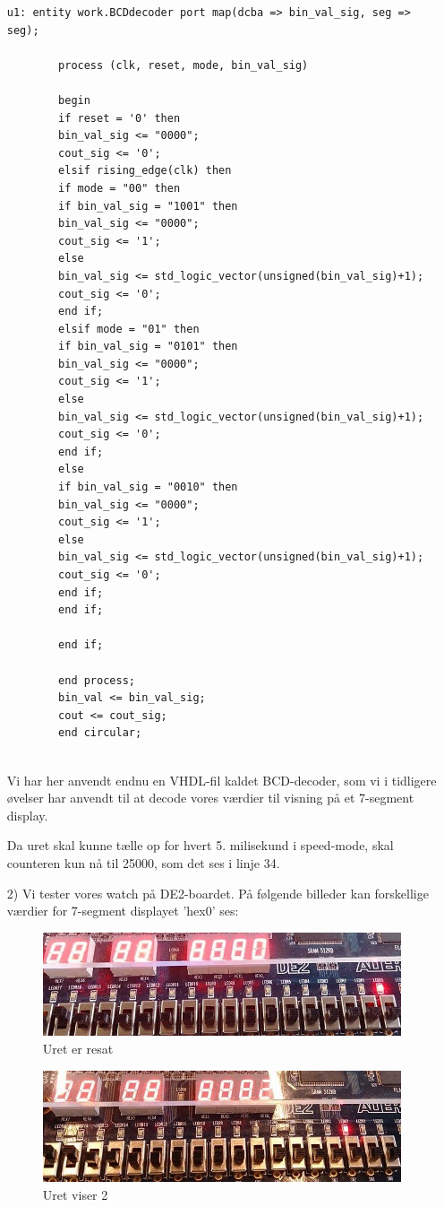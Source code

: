 \begin{enumerate}
\begin{lstlisting}[caption={VHDL code for binary circular counter},label={lst:Counter}]
		u1: entity work.BCDdecoder port map(dcba => bin_val_sig, seg => seg);
		
		process (clk, reset, mode, bin_val_sig)
		
		begin
		if reset = '0' then
		bin_val_sig <= "0000";
		cout_sig <= '0';
		elsif rising_edge(clk) then
		if mode = "00" then
		if bin_val_sig = "1001" then 
		bin_val_sig <= "0000";
		cout_sig <= '1';
		else
		bin_val_sig <= std_logic_vector(unsigned(bin_val_sig)+1);
		cout_sig <= '0';
		end if;
		elsif mode = "01" then
		if bin_val_sig = "0101" then 
		bin_val_sig <= "0000";
		cout_sig <= '1';
		else
		bin_val_sig <= std_logic_vector(unsigned(bin_val_sig)+1);
		cout_sig <= '0';
		end if;
		else 
		if bin_val_sig = "0010" then 
		bin_val_sig <= "0000";
		cout_sig <= '1';
		else
		bin_val_sig <= std_logic_vector(unsigned(bin_val_sig)+1);
		cout_sig <= '0';
		end if;
		end if;
		
		end if;
		
		end process;
		bin_val <= bin_val_sig;
		cout <= cout_sig;
		end circular;
		
		\end{lstlisting}
		
		Vi har her anvendt endnu en VHDL-fil kaldet BCD-decoder, som vi i tidligere øvelser har anvendt til at decode vores værdier til visning på et 7-segment display.
		
		Da uret skal kunne tælle op for hvert 5. milisekund i speed-mode, skal counteren kun nå til 25000, som det ses i linje 34.
		
\item[2)] Vi tester vores watch på DE2-boardet. På følgende billeder kan forskellige værdier for 7-segment displayet 'hex0' ses:
		\begin{figure}[h]
			\centering
			\includegraphics[scale=0.8]{pictures/Oevelse6/opg1/watch0.JPG}
			\caption{Uret er resat}
			\label{fig:alarm0}
		\end{figure}
		
		\begin{figure}[h]
			\centering
			\includegraphics[scale=0.8]{pictures/Oevelse6/opg1/watch2.JPG}
			\caption{Uret viser 2}
			\label{fig:alarm2}
		\end{figure}


\end{enumerate}
